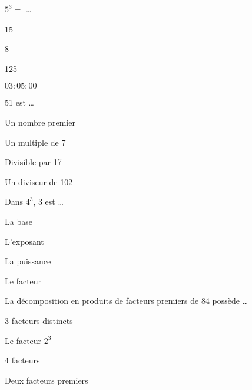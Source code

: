      



\begin{QCM}
  \begin{GroupeQCM} 

    \begin{exercice}
      $5^3 =$ \ldots
      \begin{ChoixQCM}{4}
      \item 15
      \item 8
      \item 125
      \item $03:05:00$
      \end{ChoixQCM}
\begin{corrige}
   \end{corrige}
    \end{exercice}
    
    \begin{exercice}
      51 est \ldots
      \begin{ChoixQCM}{4}
      \item Un nombre premier
      \item Un multiple de 7
      \item Divisible par 17
      \item Un diviseur de 102
      \end{ChoixQCM}
\begin{corrige}
   \end{corrige}
    \end{exercice}
    
    \begin{exercice}
      Dans $4^3$, 3 est \ldots
      \begin{ChoixQCM}{4}
      \item La base
      \item L'exposant
      \item La puissance
      \item Le facteur
      \end{ChoixQCM}
\begin{corrige}
   \end{corrige}
    \end{exercice}
    
    \begin{exercice}
      La décomposition en produits de facteurs premiers de 84 possède \ldots
      \begin{ChoixQCM}{4}
      \item 3 facteurs distincts
      \item Le facteur $2^3$
      \item 4 facteurs
      \item Deux facteurs premiers
      \end{ChoixQCM}
\begin{corrige}
   \end{corrige}
    \end{exercice}
    
\end{GroupeQCM}
\end{QCM}

  
